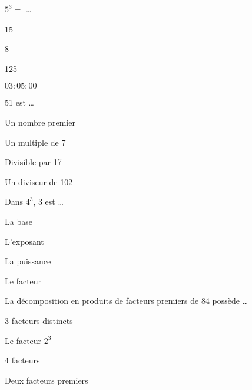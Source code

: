      



\begin{QCM}
  \begin{GroupeQCM} 

    \begin{exercice}
      $5^3 =$ \ldots
      \begin{ChoixQCM}{4}
      \item 15
      \item 8
      \item 125
      \item $03:05:00$
      \end{ChoixQCM}
\begin{corrige}
   \end{corrige}
    \end{exercice}
    
    \begin{exercice}
      51 est \ldots
      \begin{ChoixQCM}{4}
      \item Un nombre premier
      \item Un multiple de 7
      \item Divisible par 17
      \item Un diviseur de 102
      \end{ChoixQCM}
\begin{corrige}
   \end{corrige}
    \end{exercice}
    
    \begin{exercice}
      Dans $4^3$, 3 est \ldots
      \begin{ChoixQCM}{4}
      \item La base
      \item L'exposant
      \item La puissance
      \item Le facteur
      \end{ChoixQCM}
\begin{corrige}
   \end{corrige}
    \end{exercice}
    
    \begin{exercice}
      La décomposition en produits de facteurs premiers de 84 possède \ldots
      \begin{ChoixQCM}{4}
      \item 3 facteurs distincts
      \item Le facteur $2^3$
      \item 4 facteurs
      \item Deux facteurs premiers
      \end{ChoixQCM}
\begin{corrige}
   \end{corrige}
    \end{exercice}
    
\end{GroupeQCM}
\end{QCM}

  
